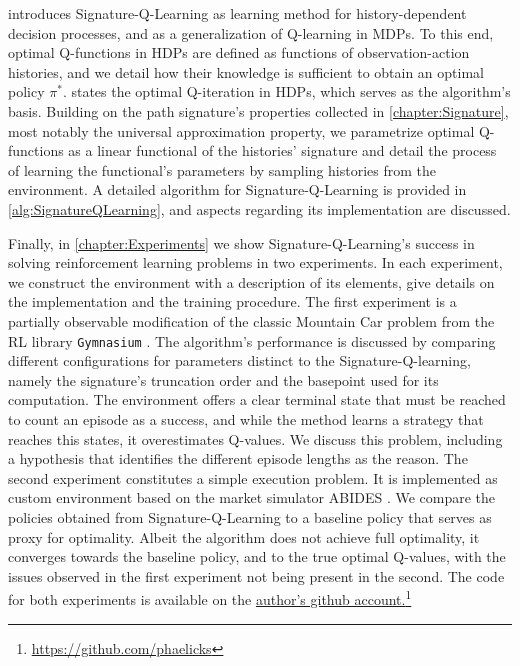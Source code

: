 \documentclass[
    a4paper,
    11pt,
    bibliography=totoc,
    listof=totoc,      
    headinclude=true,
    cleardoublepage=empty,
]{scrbook}
\theoremstyle{plain}
\theoremstyle{definition}
\theoremstyle{remark}
\begin{document}
 introduces Signature-Q-Learning as learning 
method for history-dependent decision 
processes, and as a generalization of Q-learning in MDPs. To this end, optimal 
Q-functions in HDPs are defined as functions of observation-action histories, 
and we detail how their knowledge is sufficient to obtain an optimal policy 
$\pi^*$.  states the optimal Q-iteration in 
HDPs, which serves as the algorithm's basis. Building on the path signature's 
properties collected in \cref{chapter:Signature}, most notably the universal 
approximation property, we parametrize optimal Q-functions as a linear 
functional of the histories' signature and detail the process of learning the 
functional's parameters by sampling histories from the environment. A detailed 
algorithm for Signature-Q-Learning is provided in \cref{alg:SignatureQLearning}, 
and aspects regarding its implementation are discussed.

Finally, in \cref{chapter:Experiments} we show Signature-Q-Learning's success 
in solving reinforcement learning problems in two experiments. In each 
experiment, we construct the environment with a description of its elements, 
give details on the implementation and the training procedure. The 
first experiment is a partially observable modification of the classic 
Mountain Car problem from the RL library \texttt{Gymnasium} 
\cite{towers2023_gv0}. The algorithm's performance is discussed by comparing 
different configurations for parameters distinct to the Signature-Q-learning, 
namely the signature's truncation order and the basepoint used for its 
computation. The environment offers a clear terminal state that must be 
reached to count an episode as a success, and while the method learns a 
strategy that reaches this states, it overestimates Q-values. We discuss this 
problem, including a hypothesis that identifies the 
different episode lengths as the reason. The second experiment constitutes a 
simple execution problem. It is implemented as custom environment based on the 
market simulator ABIDES \cite{byrd2020_athmms,amrouni2022_aemdesafm}. We 
compare the policies obtained from Signature-Q-Learning to a baseline policy 
that serves as proxy for optimality. Albeit the algorithm does not achieve 
full optimality, it converges towards the baseline policy, and to the true 
optimal Q-values, with the issues observed in the first experiment not being 
present in the second. The code for both experiments is available on the 
\href{https://github.com/phaelicks}{author's github account.}\footnote{
    \url{https://github.com/phaelicks}
} 
\end{document}
